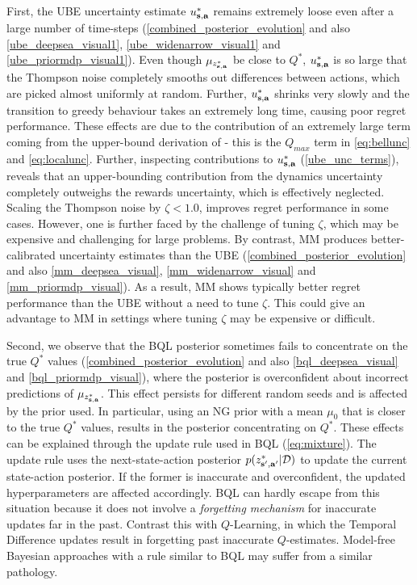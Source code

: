 \documentclass{article}
\begin{document}
First, the UBE uncertainty estimate $u^*_{\mathbf{s}, \mathbf{a}}$ remains extremely loose even after a large number of time-steps (\cref{combined_posterior_evolution} and also \cref{ube_deepsea_visual1}, \cref{ube_widenarrow_visual1} and \cref{ube_priormdp_visual1}). Even though $\mu_{z^*_{\mathbf{s}, \mathbf{a}}}$ be close to $Q^*$, $u^*_{\mathbf{s}, \mathbf{a}}$ is so large that the Thompson noise completely smooths out differences between actions, which are picked almost uniformly at random. Further, $u^*_{\mathbf{s}, \mathbf{a}}$ shrinks very slowly and the transition to greedy behaviour takes an extremely long time, causing poor regret performance. These effects are due to the contribution of an extremely large term coming from the upper-bound derivation of \cite{ube} - this is the $Q_{max}$ term in \cref{eq:bellunc} and \cref{eq:localunc}. Further, inspecting contributions to $u^*_{\mathbf{s}, \mathbf{a}}$ (\cref{ube_unc_terms}), reveals that an upper-bounding contribution from the dynamics uncertainty completely outweighs the rewards uncertainty, which is effectively neglected. Scaling the Thompson noise by $\zeta < 1.0$, improves regret performance in some cases. However, one is further faced by the challenge of tuning $\zeta$, which may be expensive and challenging for large problems. By contrast, MM produces better-calibrated uncertainty estimates than the UBE (\cref{combined_posterior_evolution} and also \cref{mm_deepsea_visual}, \cref{mm_widenarrow_visual} and \cref{mm_priormdp_visual}). As a result, MM shows typically better regret performance than the UBE without a need to tune $\zeta$. This could give an advantage to MM in settings where tuning $\zeta$ may be expensive or difficult.

Second, we observe that the BQL posterior sometimes fails to concentrate on the true $Q^*$ values (\cref{combined_posterior_evolution} and also \cref{bql_deepsea_visual} and \cref{bql_priormdp_visual}), where the posterior is overconfident about incorrect predictions of $\mu_{z^*_{\mathbf{s}, \mathbf{a}}}$. This effect persists for different random seeds and is affected by the prior used. In particular, using an NG prior with a mean $\mu_0$ that is closer to the true $Q^*$ values, results in the posterior concentrating on $Q^*$. These effects can be explained through the update rule used in BQL (\cref{eq:mixture}). The update rule uses the next-state-action posterior $p(z^*_{\mathbf{s}', \mathbf{a}'} | \mathcal{D})$ to update the current state-action posterior. If the former is inaccurate and overconfident, the updated hyperparameters are affected accordingly. BQL can hardly escape from this situation because it does not involve a \textit{forgetting mechanism} for inaccurate updates far in the past. Contrast this with $Q$-Learning, in which the Temporal Difference updates result in forgetting past inaccurate $Q$-estimates. Model-free Bayesian approaches with a rule similar to BQL may suffer from a similar pathology.
\end{document}
